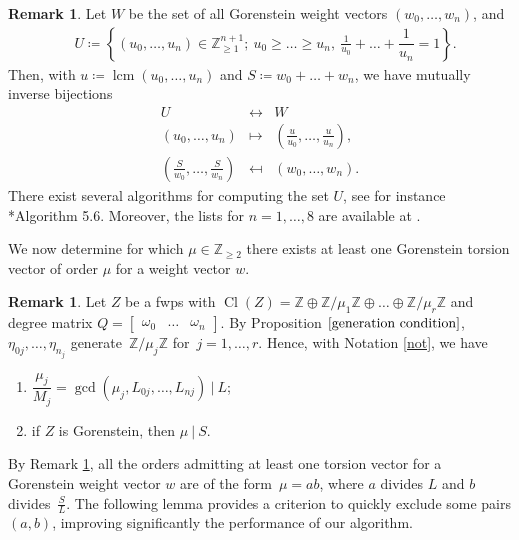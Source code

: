 \documentclass{amsart}
\DeclareMathOperator{\Cl}{Cl}
\DeclareMathOperator{\lcm}{lcm}
\newcommand{\Z}{\mathbb{Z}}
\theoremstyle{definition}
\newtheorem{remark}[lem]{Remark}
\begin{document}
\begin{remark}\label{rmk:wps}
    Let $W$ be the set of all Gorenstein weight vectors $(w_0,\dots,w_n)$, and
    \begin{align*}
    &U\coloneqq \left\{(u_0,\dots,u_n)\in\Z_{\geq 1}^{n+1}; \ u_0\geq \dots\geq u_n, \ \frac{1}{u_0}+\dots+\dfrac{1}{u_n}=1\right\}.
    \end{align*}
    Then, with $u\coloneqq\lcm(u_0,\dots,u_n)$ and $S\coloneqq w_0+\dots+w_n$, we have mutually inverse bijections
    $$
    \begin{array}{ccc}
        U & \longleftrightarrow &  W\\[5pt]
        (u_0,\dots,u_n) & \mapsto & \left(\frac{u}{u_0},\dots,\frac{u}{u_n}\right),\\[5pt]
        \left(\frac{S}{w_0},\dots,\frac{S}{w_n}\right) & \mapsfrom & (w_0,\dots,w_n).
    \end{array}
    $$
    There exist several algorithms for computing the set $U$, see for instance \cite{B}*{Algorithm 5.6}.
    Moreover, the lists for $n=1,\dots,8$ are available at \cite{OEIS}.
\end{remark} 

We now determine for which $\mu\in\Z_{\geq 2}$ there exists at least one Gorenstein torsion vector of order $\mu$ for a weight vector $w$.

\begin{remark} \label{rmk: torsion}
    Let $Z$ be a fwps with $\Cl(Z)=\Z\oplus \Z/\mu_1\Z\oplus\dots\oplus\Z/\mu_r\Z$ and  degree matrix $Q=\begin{bmatrix}
        \omega_0 & \dots & \omega_n
    \end{bmatrix}$. By Proposition $\ref{generation condition}$, $\eta_{0j},\dots,\eta_{n_j}$ generate~$\Z/\mu_j\Z$ for~$j=1,\dots,r$. Hence, with Notation \ref{not}, we have
    \begin{enumerate}
        \item $\dfrac{\mu_j}{M_j}=\gcd(\mu_j,L_{0j},\dots,L_{nj}) \ | \ L$;\\
        \item if $Z$ is Gorenstein, then $\mu\ |\ S$.
    \end{enumerate}
\end{remark}

By Remark \ref{rmk: torsion}, all the orders admitting at least one torsion vector for a Gorenstein weight vector $w$ are of the form~$\mu=ab$, where $a$ divides $L$ and $b$ divides~$\frac{S}{L}$. The following lemma provides a criterion to quickly exclude some pairs $(a,b)$, improving significantly the performance of our algorithm.
\end{document}
